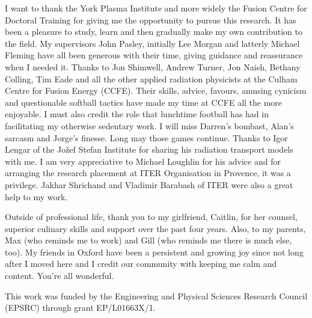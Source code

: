 
\begin{acknowledgements}      
I want to thank the York Plasma Institute and more widely the Fusion Centre for Doctoral Training for giving me the opportunity to pursue this research. It has been a pleasure to study, learn and then gradually make my own contribution to the field. My supervisors John Pasley, initially Lee Morgan and latterly Michael Fleming have all been generous with their time, giving guidance and reassurance when I needed it. Thanks to Jon Shimwell, Andrew Turner, Jon Naish, Bethany Colling, Tim Eade and all the other applied radiation physicists at the Culham Centre for Fusion Energy (CCFE). Their skills, advice, favours, amusing cynicism and questionable softball tactics have made my time at CCFE all the more enjoyable. I must also credit the role that lunchtime football has had in facilitating my otherwise sedentary work. I will miss Darren's bombast, Alan's sarcasm and Jorge's finesse. Long may those games continue. Thanks to Igor Lengar of the Jo\v zef Stefan Institute for sharing his radiation transport models with me. I am very appreciative to Michael Loughlin for his advice and for arranging the research placement at ITER Organisation in Provence, it was a privilege. Jakhar Shrichand and Vladimir Barabash of ITER were also a great help to my work.

Outside of professional life, thank you to my girlfriend, Caitlin, for her counsel, superior culinary skills and support over the past four years. Also, to my parents, Max (who reminds me to work) and Gill (who reminds me there is much else, too). My friends in Oxford have been a persistent and growing joy since not long after I moved here and I credit our community with keeping me calm and content. You're all wonderful.

This work was funded by the Engineering and Physical Sciences Research Council (EPSRC) through grant EP/L01663X/1.
\end{acknowledgements}
